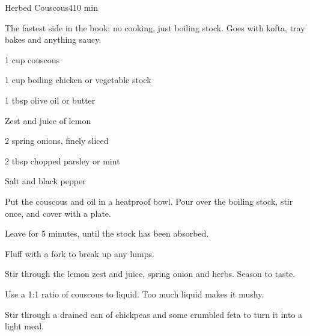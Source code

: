 \begin{recipebox}{Herbed Couscous}{4}{10 min}

The fastest side in the book: no cooking, just boiling stock. Goes with kofta,
tray bakes and anything saucy.

\begin{ingredients}
  \item 1 cup couscous
  \item 1 cup boiling chicken or vegetable stock
  \item 1 tbsp olive oil or butter
  \item Zest and juice of  lemon
  \item 2 spring onions, finely sliced
  \item 2 tbsp chopped parsley or mint
  \item Salt and black pepper
\end{ingredients}

\begin{method}
  \item Put the couscous and oil in a heatproof bowl. Pour over the boiling stock, stir once, and cover with a plate.
  \item Leave for 5 minutes, until the stock has been absorbed.
  \item Fluff with a fork to break up any lumps.
  \item Stir through the lemon zest and juice, spring onion and herbs. Season to taste.
\end{method}

\begin{notelist}
  \item Use a 1:1 ratio of couscous to liquid. Too much liquid makes it mushy.
  \item Stir through a drained can of chickpeas and some crumbled feta to turn it into a light meal.
\end{notelist}

\end{recipebox}
